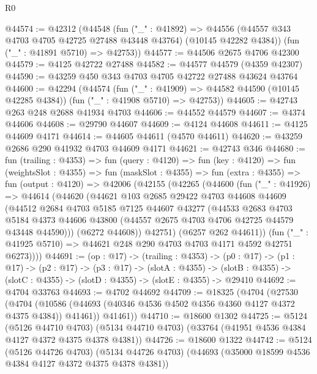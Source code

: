 \begin{lexlean}{R0}
\begin{coremodule}
@44574 := @42312
    (@44548
      (fun ("_" : @41892) =>
      @44556 (@44557 @343 @4703 @4705 @42725 @27488 @43448 @43764) (@10145 @42282 @4384))
      (fun ("_" : @41891 @5710) => @42753))
@44577 := @44506 @2675 @4706 @42300
@44579 := @4125 @42722 @27488
@44582 := @44577 @44579 (@4359 @42307)
@44590 := @43259 @450 @343 @4703 @4705 @42722 @27488 @43624 @43764
@44600 := @42294
    (@44574
      (fun ("_" : @41909) => @44582 @44590 (@10145 @42285 @4384))
      (fun ("_" : @41908 @5710) => @42753))
@44605 := @42743 @263 @248 @2688 @41934 @4703
@44606 := @44552 @44579
@44607 := @4374 @44606
@44608 := @29790 @44607
@44609 := @4124 @44608
@44611 := @4125 @44609 @4171
@44614 := @44605 @44611 (@4570 @44611)
@44620 := @43259 @2686 @290 @41932 @4703 @44609 @4171
@44621 := @42743 @346
@44680 := fun (trailing : @4353) =>
  fun (query : @4120) =>
  fun (key : @4120) =>
  fun (weightsSlot : @4355) =>
  fun (maskSlot : @4355) =>
  fun (extra : @4355) =>
  fun (output : @4120) =>
  @42006
    (@42155
      (@42265
        (@44600
          (fun ("_" : @41926) =>
          @44614
            (@44620
              (@44621
                @103
                @2685
                @29422
                @4703
                @44608
                @44609
                (@44512
                  @2684
                  @4703
                  @5185
                  @7125
                  @44607
                  @43277
                  (@44533
                    @2683
                    @4703
                    @5184
                    @4373
                    @44606
                    @43800
                    (@44557 @2675 @4703 @4706 @42725 @44579 @43448 @44590)))
                (@6272 @44608))
              @42751)
            (@6257 @262 @44611))
          (fun ("_" : @41925 @5710) => @44621 @248 @290 @4703 @4703 @4171 @4592 @42751 @6273))))
@44691 := (op : @17) ->
  (trailing : @4353) ->
  (p0 : @17) ->
  (p1 : @17) ->
  (p2 : @17) ->
  (p3 : @17) ->
  (slotA : @4355) ->
  (slotB : @4355) -> (slotC : @4355) -> (slotD : @4355) -> (slotE : @4355) -> @29410
@44692 := @4704 @33763
@44693 := @4702 @44692
@44709 := @18325
    (@4704
      (@27530
        (@4704 (@10586 (@44693 (@40346 @4536 @4502 @4356 @4360 @4127 @4372 @4375 @4384)) @41461))
        @41461))
@44710 := @18600 @1302
@44725 := @5124
    (@5126 @44710 @4703)
    (@5134 @44710 @4703)
    (@33764 (@41951 @4536 @4384 @4127 @4372 @4375 @4378 @4381))
@44726 := @18600 @1322
@44742 := @5124
    (@5126 @44726 @4703)
    (@5134 @44726 @4703)
    (@44693 (@35000 @18599 @4536 @4384 @4127 @4372 @4375 @4378 @4381))

\end{coremodule}
\end{lexlean}
